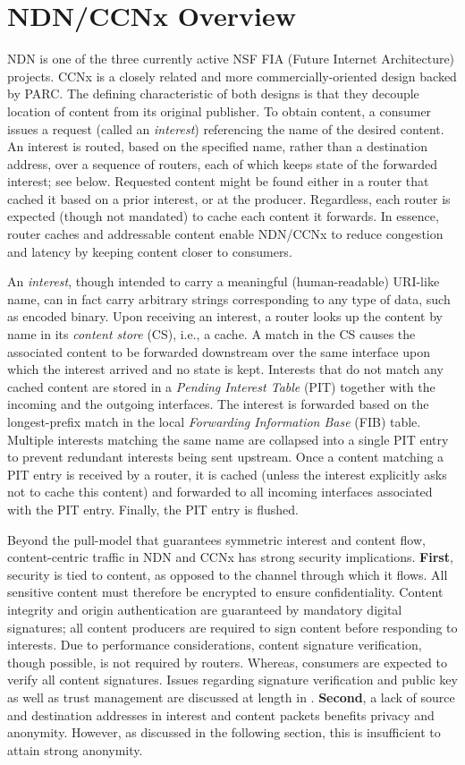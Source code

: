 \section{NDN/CCNx Overview}
NDN is one of the three currently active NSF FIA (Future Internet Architecture) projects. CCNx is a closely related and more commercially-oriented design backed by PARC. The defining characteristic of both designs is that they decouple location of content from its original publisher. To obtain content, a consumer issues a request (called an {\em interest}) referencing the name of the desired content. An interest is routed, based on the specified name, rather than a destination address, over a sequence of routers, each of which keeps state of the forwarded interest; see below. Requested content might be found either in a router that cached it based on a prior interest, or at the producer. Regardless, each router is expected (though not mandated) to cache each content it forwards. In essence, router caches and addressable content enable NDN/CCNx to reduce congestion and latency by keeping content closer to consumers. 

An \emph{interest}, though intended to carry a meaningful (human-readable) URI-like name, can in fact carry arbitrary strings corresponding to any type of data, such as encoded binary. Upon receiving an interest, a router looks up the content by name in its \emph{content store} (CS), i.e., a cache. A match in the CS causes the associated content to be forwarded downstream over the same interface upon which the interest arrived and no state is kept. Interests that do not match any cached content are stored in a \emph{Pending Interest Table} (PIT) together with the incoming and the outgoing interfaces. The interest is forwarded based on the longest-prefix match in the local \emph{Forwarding Information Base} (FIB) table. Multiple interests matching the same name are collapsed into a single PIT entry to prevent redundant interests being sent upstream. Once a content matching a PIT entry is received by a router, it is cached (unless the interest explicitly asks not to cache this content) and forwarded to all incoming interfaces associated with the PIT entry. Finally, the PIT entry is flushed.

Beyond the pull-model that guarantees symmetric interest and content flow, content-centric traffic in NDN and CCNx has strong security implications. {\bf First}, security is tied to content, as opposed to the channel through which it flows. All sensitive content must therefore be encrypted to ensure confidentiality. Content integrity and origin authentication are guaranteed by mandatory digital signatures; all content producers are required to sign content before responding to interests. Due to performance considerations, content signature verification, though possible, is not required by routers. Whereas, consumers are expected to verify all content signatures. Issues regarding signature verification and public key as well as trust management are discussed at length in \cite{ghali2014elements}. {\bf Second}, a lack of source and destination addresses in interest and content packets benefits privacy and anonymity. However, as discussed in the following section, this is insufficient to attain strong anonymity. 